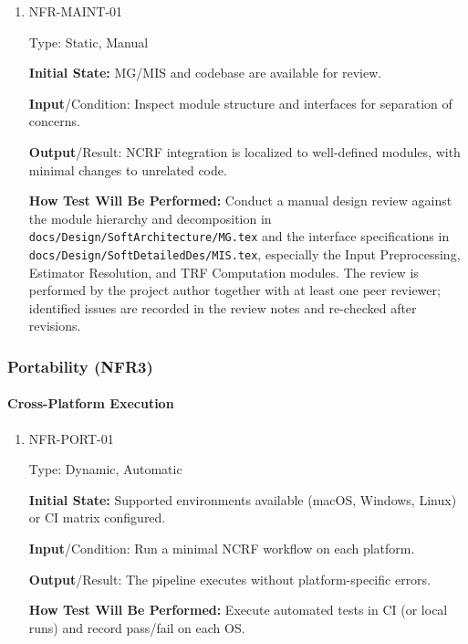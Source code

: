 \documentclass[12pt, titlepage]{article}
\begin{document}
\begin{enumerate}

\item{NFR-MAINT-01\\}

Type: Static, Manual
					
\textbf{Initial State:} MG/MIS and codebase are available for review.
					
\textbf{Input}/Condition: Inspect module structure and interfaces for separation of concerns.
					
\textbf{Output}/Result: NCRF integration is localized to well-defined modules, with minimal changes to unrelated code.
					
\textbf{How Test Will Be Performed:} Conduct a manual design review against the module hierarchy and decomposition in \texttt{docs/Design/SoftArchitecture/MG.tex} and the interface specifications in \texttt{docs/Design/SoftDetailedDes/MIS.tex}, especially the Input Preprocessing, Estimator Resolution, and TRF Computation modules. The review is performed by the project author together with at least one peer reviewer; identified issues are recorded in the review notes and re-checked after revisions.

\end{enumerate}

\subsubsection{Portability (NFR3)}
		
\paragraph{Cross-Platform Execution}

\begin{enumerate}

\item{NFR-PORT-01\\}

Type: Dynamic, Automatic
					
\textbf{Initial State:} Supported environments available (macOS, Windows, Linux) or CI matrix configured.
					
\textbf{Input}/Condition: Run a minimal NCRF workflow on each platform.
					
\textbf{Output}/Result: The pipeline executes without platform-specific errors.
					
\textbf{How Test Will Be Performed:} Execute automated tests in CI (or local runs) and record pass/fail on each OS.

\end{enumerate}
\end{document}
